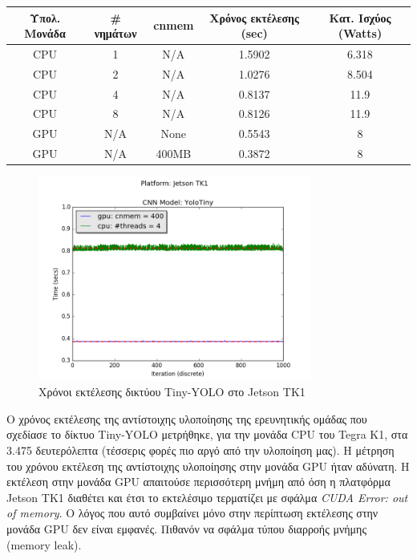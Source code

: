 \begin{center}
  \small
  \begin{tabular}[center]{ | c | c | c | c | c | }
    \hline
    \rowcolor{Gray}
    Υπολ. Μονάδα & \# νημάτων & cnmem & Χρόνος εκτέλεσης (sec) & Κατ. Ισχύος (Watts) \\
    \hline
    CPU & 1 & N/A & 1.5902 & 6.318\\
    CPU & 2 & N/A & 1.0276 & 8.504\\
    CPU & 4 & N/A & 0.8137 & 11.9\\
    CPU & 8 & N/A & 0.8126 & 11.9\\
    GPU & N/A & None & 0.5543 & 8\\
    GPU & N/A & 400MB & 0.3872 & 8\\
    \hline
  \end{tabular}
\end{center}

\begin{figure}[!ht]
  \centering
  \includegraphics[width=0.8\textwidth]{./images/chapter6/benchmark_yolotiny_jetson.png}
  \caption[Χρόνoι εκτέλεσης δικτύου Tiny-YOLO στο Jetson TK1]{Χρόνοι εκτέλεσης δικτύου Tiny-YOLO στο Jetson TK1}
  \label{fig:yolotiny_results_jetson}
\end{figure}

Ο χρόνος εκτέλεσης της αντίστοιχης υλοποίησης της ερευνητικής ομάδας που
σχεδίασε το δίκτυο Tiny-YOLO μετρήθηκε, για την μονάδα CPU του Tegra K1,
στα 3.475 δευτερόλεπτα (τέσσερις φορές πιο αργό από την υλοποίηση
μας).
Η μέτρηση του χρόνου εκτέλεση της αντίστοιχης
υλοποίησης στην μονάδα GPU ήταν αδύνατη. Η εκτέλεση στην μονάδα GPU
απαιτούσε περισσότερη μνήμη από όση η πλατφόρμα Jetson TK1 διαθέτει και έτσι
το εκτελέσιμο τερματίζει με σφάλμα \emph{CUDA Error: out of memory}.
Ο λόγος που αυτό συμβαίνει μόνο στην περίπτωση εκτέλεσης στην μονάδα GPU
δεν είναι εμφανές. Πιθανόν να σφάλμα τύπου διαρροής μνήμης (memory leak).
